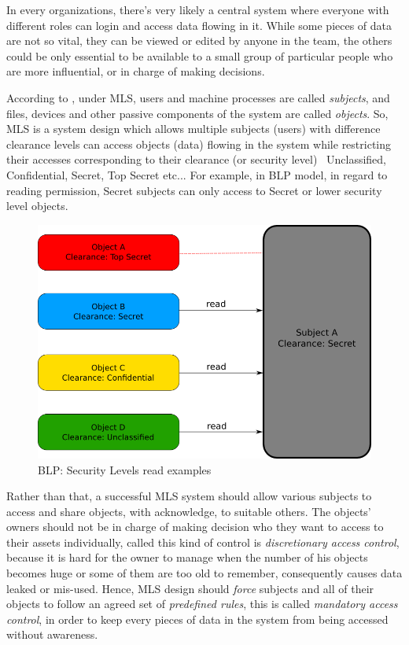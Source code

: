 In every organizations, there's very likely a central system where everyone with different roles can login and access data flowing in it.
While some pieces of data are not so vital, they can be viewed or edited by anyone in the team, the others could be only essential to be available to a small group of particular people who are more influential, or in charge of making decisions.

According to \citeauthor{bancinco:2015} , under MLS, users and machine processes are called \emph{subjects}, and files, devices and other passive components of the system are called \emph{objects}.
So, MLS is a system design which allows multiple subjects (users) with difference clearance levels can access objects (data) flowing in the system while restricting their accesses corresponding to their clearance (or security level) \eg\ Unclassified, Confidential, Secret, Top Secret etc...
For example, in BLP model, in regard to reading permission, Secret subjects can only access to Secret or lower security level objects.

\begin{figure}[bth]                                                                                                                                                  
\myfloatalign
\includegraphics[width=1.0\linewidth]{gfx/chapter_2/security_level_read_example}
\caption[BLP: Security Levels read examples]{BLP: Security Levels read examples}\label{fig:security_level_read_example}
\end{figure}

Rather than that, a successful MLS system should allow various subjects to access and share objects, with acknowledge, to suitable others.
The objects' owners should not be in charge of making decision who they want to access to their assets individually, \citeauthor{prasun:1996} called this kind of control is \emph{discretionary access control}, because it is hard for the owner to manage when the number of his objects becomes huge or some of them are too old to remember, consequently causes data leaked or mis-used.
Hence, MLS design should \emph{force} subjects and all of their objects to follow an agreed set of \emph{predefined rules}, this is called \emph{mandatory access control}, in order to keep every pieces of data in the system from being accessed without awareness.

